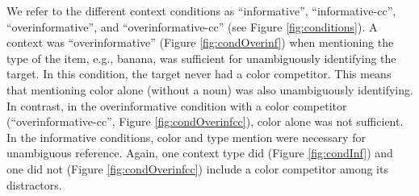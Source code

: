 \documentclass[11pt]{article}
\newcommand{\figref}[1]{Figure \ref{#1}}
\begin{document}
We refer to the different context conditions  as ``informative'', ``informative-cc'', ``overinformative'', and ``overinformative-cc'' (see \figref{fig:conditions}). A context was ``overinformative'' (\figref{fig:condOverinf}) when mentioning the type of the item, e.g., banana, was sufficient for unambiguously identifying the target.  In this condition, the target never had a color competitor. This means that mentioning color alone (without a noun) was also unambiguously identifying. In contrast, in the overinformative condition with a color competitor (``overinformative-cc'', \figref{fig:condOverinfcc}), color alone was not sufficient. In the informative conditions, color and type mention were necessary for unambiguous reference. Again, one context type did (\figref{fig:condInf}) and one did not (\figref{fig:condOverinfcc}) include a color competitor among its distractors.
\end{document}
